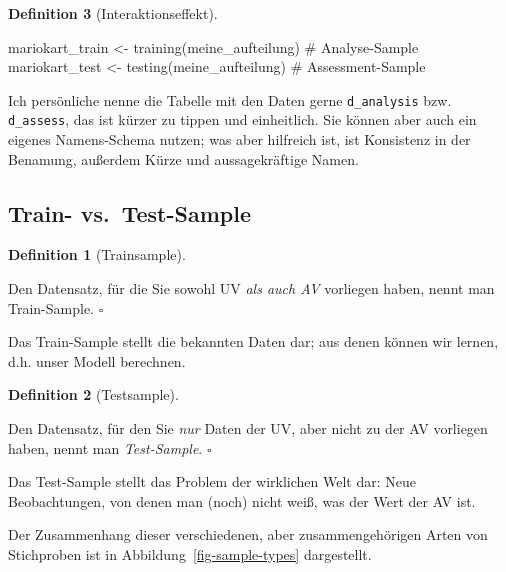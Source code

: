 \documentclass[
  letterpaper,
]{scrbook}
\newenvironment{Shaded}{\begin{snugshade}}{\end{snugshade}}
\newcommand{\CommentTok}[1]{\textcolor[rgb]{0.37,0.37,0.37}{#1}}
\newcommand{\FunctionTok}[1]{\textcolor[rgb]{0.28,0.35,0.67}{#1}}
\newcommand{\NormalTok}[1]{\textcolor[rgb]{0.00,0.23,0.31}{#1}}
\newcommand{\OtherTok}[1]{\textcolor[rgb]{0.00,0.23,0.31}{#1}}
\theoremstyle{definition}
\theoremstyle{definition}
\theoremstyle{definition}
\newtheorem{definition}{Definition}[chapter]
\theoremstyle{remark}
\begin{document}
\begin{definition}[Interaktionseffekt]
\begin{Shaded}
\begin{Highlighting}[]
\NormalTok{mariokart\_train }\OtherTok{\textless{}{-}} 
  \FunctionTok{training}\NormalTok{(meine\_aufteilung)  }\CommentTok{\# Analyse{-}Sample}
\NormalTok{mariokart\_test }\OtherTok{\textless{}{-}} 
  \FunctionTok{testing}\NormalTok{(meine\_aufteilung)  }\CommentTok{\# Assessment{-}Sample}
\end{Highlighting}
\end{Shaded}

Ich persönliche nenne die Tabelle mit den Daten gerne
\texttt{d\_analysis} bzw. \texttt{d\_assess}, das ist kürzer zu tippen
und einheitlich. Sie können aber auch ein eigenes Namens-Schema nutzen;
was aber hilfreich ist, ist Konsistenz in der Benamung, außerdem Kürze
und aussagekräftige Namen.

\subsection{Train- vs.~Test-Sample}\label{train--vs.-test-sample}

\begin{definition}[Trainsample]\protect\hypertarget{def-trainsample}{}\label{def-trainsample}

Den Datensatz, für die Sie sowohl UV \emph{als auch AV} vorliegen haben,
nennt man Train-Sample. \(\square\)

\end{definition}

Das Train-Sample stellt die bekannten Daten dar; aus denen können wir
lernen, d.h. unser Modell berechnen.

\begin{definition}[Testsample]\protect\hypertarget{def-testsample}{}\label{def-testsample}

Den Datensatz, für den Sie \emph{nur} Daten der UV, aber nicht zu der AV
vorliegen haben, nennt man \emph{Test-Sample}. \(\square\)

\end{definition}

Das Test-Sample stellt das Problem der wirklichen Welt dar: Neue
Beobachtungen, von denen man (noch) nicht weiß, was der Wert der AV ist.

Der Zusammenhang dieser verschiedenen, aber zusammengehörigen Arten von
Stichproben ist in Abbildung~\ref{fig-sample-types} dargestellt.

\begin{figure}


\end{figure}
\end{definition}
\end{document}
